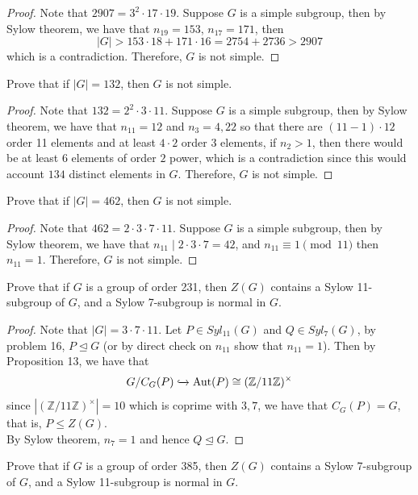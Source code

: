 \documentclass{article}
\newcommand{\Z}{\mathbb{Z}}
\newenvironment{problem}[2][Problem]{\begin{trivlist}
\item[\hskip \labelsep {\bfseries #1}\hskip \labelsep {\bfseries #2.}]}{\end{trivlist}}
\DeclareMathOperator{\Aut}{Aut}
\begin{document}
\begin{proof}
    Note that $2907 = 3^2 \cdot 17 \cdot 19$. Suppose $G$ is a simple subgroup, then by Sylow theorem, we have that $n_{19} = 153$, $n_{17}=171$, then
    \[
        |G|>153\cdot 18+171\cdot 16 = 2754+2736>2907
    \]
    which is a contradiction. Therefore, $G$ is not simple.
\end{proof}
\begin{problem}{22}
     Prove that if $|G| = 132$, then $G$ is not simple.
\end{problem}
\begin{proof}
    Note that $132 = 2^2 \cdot 3\cdot 11$. Suppose $G$ is a simple subgroup, then by Sylow theorem, we have that $n_{11} = 12$ and $n_{3}=4, 22$ so that there are $(11-1)\cdot 12$ order 11 elements and at least $4 \cdot 2$ order 3 elements, if $n_2>1$, then there would be at least $6$ elements of order $2$ power, which is a contradiction since this would account $134$ distinct elements in $G$. Therefore, $G$ is not simple.
\end{proof}
\begin{problem}{23}
     Prove that if $|G| = 462$, then $G$ is not simple.
\end{problem}
\begin{proof}
    Note that $462=2\cdot 3 \cdot 7 \cdot 11$. Suppose $G$ is a simple subgroup, then by Sylow theorem, we have that $n_{11}\mid 2 \cdot 3 \cdot 7 =42$, and $n_{11}\equiv 1 \pmod {11}$ then $n_{11}=1$. Therefore, $G$ is not simple.
\end{proof}
\begin{problem}{24}
     Prove that if $G$ is a group of order 231, then $Z(G)$ contains a Sylow 11-subgroup of $G$, and a Sylow 7-subgroup is normal in $G$.
\end{problem}
\begin{proof}
    Note that $|G|=3\cdot 7 \cdot 11$. Let $P\in Syl_{11}(G)$ and $Q\in Syl_{7}(G)$, by problem 16, $P\trianglelefteq G$ (or by direct check on $n_{11}$ show that $n_{11}=1$). Then by Proposition 13, we have that 
    \[
        G/C_G(P) \xhookrightarrow{} \Aut(P) \cong (\Z/11\Z)^{\times}
    \]
    since $|(\Z/11\Z)^{\times}|=10$ which is coprime with $3, 7$, we have that $C_G(P)=G$, that is, $P\leq Z(G)$.\\
    By Sylow theorem, $n_{7}=1$ and hence $Q\trianglelefteq G$.
\end{proof}
\begin{problem}{25}
        Prove that if $G$ is a group of order 385, then $Z(G)$ contains a Sylow 7-subgroup of $G$, and a Sylow 11-subgroup is normal in $G$.
\end{problem}
\end{document}
